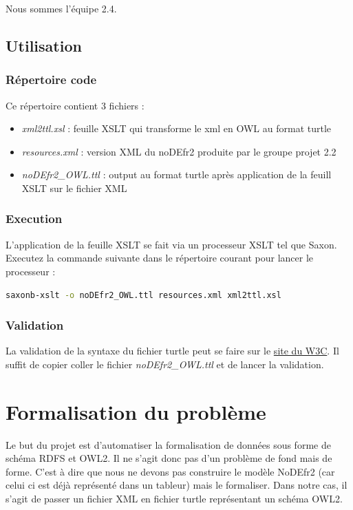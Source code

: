 \documentclass[11pt]{report}
\begin{document}
Nous sommes l'équipe 2.4.

\section{Utilisation}
\subsection{Répertoire code}
Ce répertoire contient 3 fichiers :
\begin{itemize}
\item \emph{xml2ttl.xsl} : feuille XSLT qui transforme le xml en OWL au format turtle
\item \emph{resources.xml} : version XML du noDEfr2 produite par le groupe projet 2.2
\item \emph{noDEfr2\_OWL.ttl } : output au format turtle après application de la feuill XSLT sur le fichier XML
\end{itemize}
\subsection{Execution}
L'application de la feuille XSLT se fait via un processeur XSLT tel que Saxon.
\hfill \break
\hfill \break
Executez la commande suivante dans le répertoire courant pour lancer le processeur :
\begin{lstlisting}[language=bash]
  saxonb-xslt -o noDEfr2_OWL.ttl resources.xml xml2ttl.xsl
\end{lstlisting}
\subsection{Validation}
La validation de la syntaxe du fichier turtle peut se faire sur le \href{https://www.w3.org/2015/03/ShExValidata/}{site du W3C}. Il suffit de copier coller le fichier \emph{noDEfr2\_OWL.ttl} et de lancer la validation.




\chapter{Formalisation du problème}

Le but du projet est d'automatiser la formalisation de données sous forme de schéma RDFS et OWL2. Il ne s'agit donc pas d'un problème de fond mais de forme. C'est à dire que nous ne devons pas construire le modèle NoDEfr2 (car celui ci est déjà représenté dans un tableur) mais le formaliser. Dans notre cas, il s'agit de passer un fichier XML en fichier turtle représentant un schéma OWL2.\\
\end{document}
